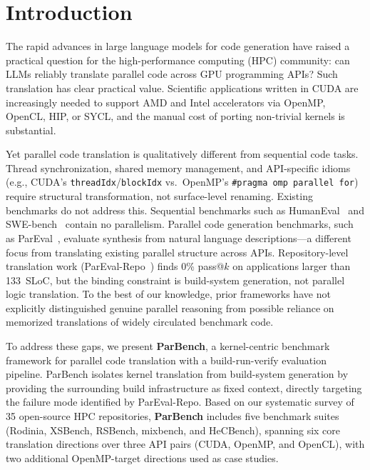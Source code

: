 \section{Introduction}
\label{sec:introduction}

The rapid advances in large language models for code generation have raised a practical question for the high-performance computing (HPC) community: can LLMs reliably translate parallel code across GPU programming APIs? Such translation has clear practical value. Scientific applications written in CUDA are increasingly needed to support AMD and Intel accelerators via OpenMP, OpenCL, HIP, or SYCL, and the manual cost of porting non-trivial kernels is substantial. 

Yet parallel code translation is qualitatively different from sequential code tasks. Thread synchronization, shared memory management, and API-specific idioms (e.g., CUDA's \texttt{threadIdx}/\texttt{blockIdx} vs.\ OpenMP's \texttt{\#pragma omp parallel for}) require structural transformation, not surface-level renaming. Existing benchmarks do not address this. Sequential benchmarks such as HumanEval~\cite{HumanEval2021} and SWE-bench~\cite{SWEbench2024} contain no parallelism. Parallel code generation benchmarks, such as ParEval~\cite{ParEval2024}, evaluate synthesis from natural language descriptions---a different focus from translating existing parallel structure across APIs. Repository-level translation work (ParEval-Repo~\cite{ParEvalRepo2025}) finds 0\% pass@$k$ on applications larger than 133~SLoC, but the binding constraint is build-system generation, not parallel logic translation. To the best of our knowledge, prior frameworks have not explicitly distinguished genuine parallel reasoning from possible reliance on memorized translations of widely circulated benchmark code.

To address these gaps, we present \textbf{ParBench}, a kernel-centric benchmark framework for parallel code translation with a build-run-verify evaluation pipeline. ParBench isolates kernel translation from build-system generation by providing the surrounding build infrastructure as fixed context, directly targeting the failure mode identified by ParEval-Repo. Based on our systematic survey of 35 open-source HPC repositories, \textbf{ParBench} includes five benchmark suites (Rodinia, XSBench, RSBench, mixbench, and HeCBench), spanning six core translation directions over three API pairs (CUDA, OpenMP, and OpenCL), with two additional OpenMP-target directions used as case studies. 

